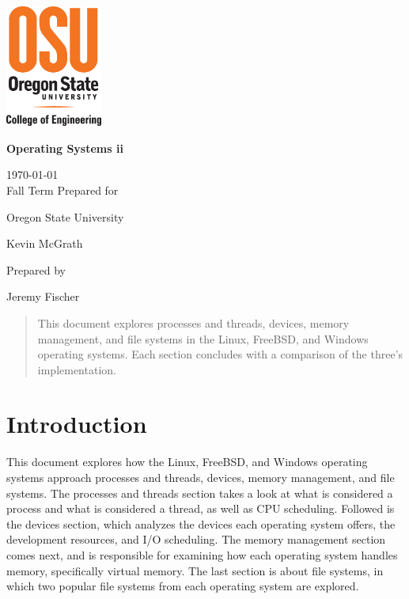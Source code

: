 \documentclass[onecolumn,draftclsnofoot, 10pt, compsoc]{IEEEtran}
\def \GroupNumber{		17}
\def \Jeremy{			Jeremy Fischer}
\def \Class{		Operating Systems ii}
\def \School{	Oregon State University}
\def \Professor{		 Kevin McGrath}
\begin{document}
\begin{titlepage}
    \begin{singlespace}
    \includegraphics[height=4cm]{coe.eps}
        \hfill  
        \par\vspace{.2in}
        \centering
        \scshape{
            \vspace{.5in}
            \textbf{\Huge\Class}\par
            \large{
            	\today \\Fall Term
        	}
            \vfill
            {\large Prepared for}\par
            \huge \School\par
            \vspace{5pt}
            {\Large{\Professor}\par}
            {\large Prepared by }\par
            \vspace{5pt}
            {\Large
                {\Jeremy}\par
            }
            \vspace{20pt}
        }
        \begin{abstract}
        	This document explores processes and threads, devices, memory management, and file systems in the Linux, FreeBSD, and Windows operating systems. 
        	Each section concludes with a comparison of the three's implementation.
        \end{abstract}     
    \end{singlespace}
\end{titlepage}
\newpage
{}
\tableofcontents
\clearpage


\section{Introduction}
	This document explores how the Linux, FreeBSD, and Windows operating systems approach processes and threads, devices, memory management, and file systems.
	The processes and threads section takes a look at what is considered a process and what is considered a thread, as well as CPU scheduling.
	Followed is the devices section, which analyzes the devices each operating system offers, the development resources, and I/O scheduling.
	The memory management section comes next, and is responsible for examining how each operating system handles memory, specifically virtual memory.
	The last section is about file systems, in which two popular file systems from each operating system are explored.
\end{document}
